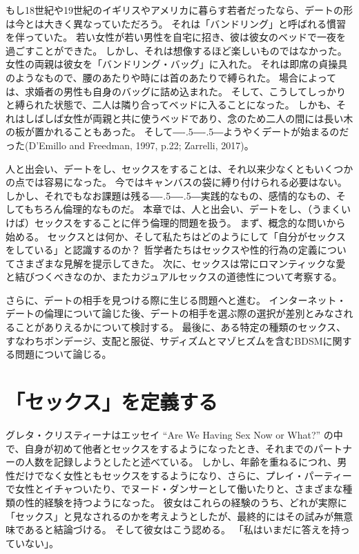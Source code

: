 \documentclass[paper=a4,book,openany]{jlreq}
\def\DDASH{―\kern-.5\zw―\kern-.5\zw―} %
\begin{document}
もし18世紀や19世紀のイギリスやアメリカに暮らす若者だったなら、デートの形は今とは大きく異なっていただろう。
それは「バンドリング」と呼ばれる慣習を伴っていた。
若い女性が若い男性を自宅に招き、彼は彼女のベッドで一夜を過ごすことができた。
しかし、それは想像するほど楽しいものではなかった。
女性の両親は彼女を「バンドリング・バッグ」に入れた。
それは即席の貞操具のようなもので、腰のあたりや時には首のあたりで縛られた。
場合によっては、求婚者の男性も自身のバッグに詰め込まれた。
そして、こうしてしっかりと縛られた状態で、二人は隣り合ってベッドに入ることになった。
しかも、それはしばしば女性が両親と共に使うベッドであり、念のため二人の間には長い木の板が置かれることもあった。
そして{\DDASH}ようやくデートが始まるのだった(D'Emillo and Freedman, 1997, p.22; Zarrelli, 2017)。

\nocite{demilio97:_intim_matter}\nocite{zarrelli17:_awkwar_centur_datin}

人と出会い、デートをし、セックスをすることは、それ以来少なくともいくつかの点では容易になった。
今ではキャンバスの袋に縛り付けられる必要はない。
しかし、それでもなお課題は残る{\DDASH}実践的なもの、感情的なもの、そしてもちろん倫理的なものだ。
本章では、人と出会い、デートをし、（うまくいけば）セックスをすることに伴う倫理的問題を扱う。
まず、概念的な問いから始める。
セックスとは何か、そして私たちはどのようにして「自分がセックスをしている」と認識するのか？ 哲学者たちはセックスや性的行為の定義についてさまざまな見解を提示してきた。
次に、セックスは常にロマンティックな愛と結びつくべきなのか、またカジュアルセックスの道徳性について考察する。

さらに、デートの相手を見つける際に生じる問題へと進む。
インターネット・デートの倫理について論じた後、デートの相手を選ぶ際の選択が差別とみなされることがありえるかについて検討する。
最後に、ある特定の種類のセックス、すなわちボンデージ、支配と服従、サディズムとマゾヒズムを含むBDSMに関する問題について論じる。

\section{「セックス」を定義する}

グレタ・クリスティーナはエッセイ ``Are We Having Sex Now or What?'' の中で、自身が初めて他者とセックスをするようになったとき、それまでのパートナーの人数を記録しようとしたと述べている。
しかし、年齢を重ねるにつれ、男性だけでなく女性ともセックスをするようになり、さらに、プレイ・パーティーで女性とイチャついたり、でヌード・ダンサーとして働いたりと、さまざまな種類の性的経験を持つようになった。
彼女はこれらの経験のうち、どれが実際に「セックス」と見なされるのかを考えようとしたが、最終的にはその試みが無意味であると結論づける。
そして彼女はこう認める。
「私はいまだに答えを持っていない」\nocite{christina92:_are_we_havin}。
\end{document}
